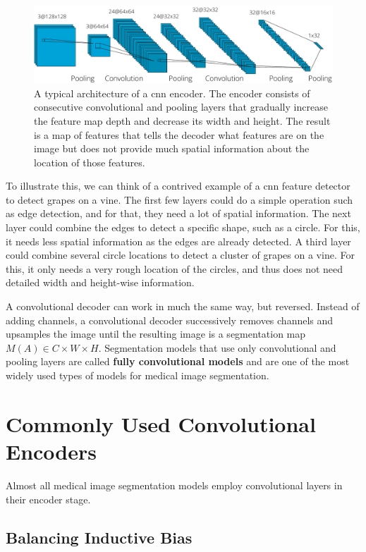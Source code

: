 \begin{figure}[h]
 \centering
 \includegraphics[width=\linewidth]{images/cnn_encoder_example.pdf}
 \caption{A typical architecture of a \ac{cnn} encoder. The encoder consists of consecutive convolutional and pooling layers that gradually increase the feature map depth and decrease its width and height. The result is a map of features that tells the decoder what features are on the image but does not provide much spatial information about the location of those features.}
 \label{fig:cnn-encoder-achitecture}
 \end{figure}

To illustrate this, we can think of a contrived example of a \ac{cnn} feature detector to detect grapes on a vine. The first few layers could do a simple operation such as edge detection, and for that, they need a lot of spatial information. The next layer could combine the edges to detect a specific shape, such as a circle. For this, it needs less spatial information as the edges are already detected. A third layer could combine several circle locations to detect a cluster of grapes on a vine. For this, it only needs a very rough location of the circles, and thus does not need detailed width and height-wise information.

A convolutional decoder can work in much the same way, but reversed. Instead of adding channels, a convolutional decoder successively removes channels and upsamples the image until the resulting image is a segmentation map $M(A) \in C \times W \times H$. Segmentation models that use only convolutional and pooling layers are called \textbf{fully convolutional models} and are one of the most widely used types of models for medical image segmentation.

\section{Commonly Used Convolutional Encoders}

Almost all medical image segmentation models employ convolutional layers in their encoder stage. 


\subsection{Balancing Inductive Bias}





